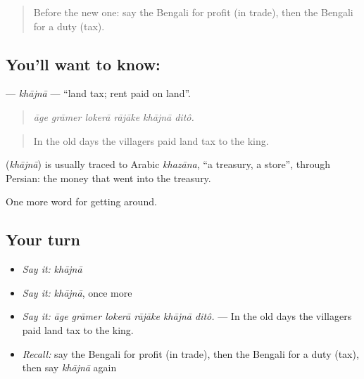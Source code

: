 \label{lesson:BN-C418-khajna}



\begin{quote}
Before the new one: say the Bengali for profit (in trade), then the Bengali for a duty (tax).
\end{quote}

\subsection*{You'll want to know: }
\textbf{} — \emph{khājnā} — \textquotedblleft{}land tax; rent paid on land\textquotedblright{}.

\begin{quote}
     
\end{quote}

\begin{quote}
\emph{āge grāmer lokerā rājāke khājnā ditô.}
\end{quote}

\begin{quote}
In the old days the villagers paid land tax to the king.
\end{quote}

\begin{cousinweb}
\textbf{} (\emph{khājnā}) is usually traced to Arabic \emph{khazāna}, \textquotedblleft{}a treasury, a store\textquotedblright{}, through Persian: the money that went into the treasury.
\end{cousinweb}

\begin{grammarlens}[title={What you've built}]
One more word for getting around.
\end{grammarlens}

\subsection*{Your turn}
\begin{itemize}
\raggedright
  \item \emph{Say it:} \emph{khājnā}
  \item \emph{Say it:} \emph{khājnā}, once more
  \item \emph{Say it:} \emph{āge grāmer lokerā rājāke khājnā ditô.} — In the old days the villagers paid land tax to the king.
  \item \emph{Recall:} say the Bengali for profit (in trade), then the Bengali for a duty (tax), then say \emph{khājnā} again
\end{itemize}

